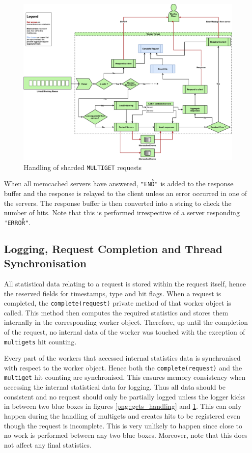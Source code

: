\documentclass[11pt,a4paper]{article}
\begin{document}
\begin{figure}[h]
    \centering
    \includegraphics[width=\textwidth]{processing/graphics/multigets_handling.png}
    \caption{Handling of sharded \texttt{MULTIGET} requests}
    \label{png::multigets_handling}
\end{figure}
When all memcached servers have answered, \texttt{"END\r\n"} is added to the response buffer and the response is relayed to the client unless an error occurred in one of the servers. The response buffer is then converted into a string to check the number of hits. Note that this is performed irrespective of a server responding \texttt{"ERROR\r\n"}.


\subsection{Logging, Request Completion and Thread Synchronisation}
All statistical data relating to a request is stored within the request itself, hence the reserved fields for timestamps, type and hit flags. When a request is completed, the \texttt{complete(request)} private method of that worker object is called. This method then computes the required statistics and stores them internally in the corresponding worker object. Therefore, up until the completion of the request, no internal data of the worker was touched with the exception of \texttt{multigets} hit counting.

Every part of the workers that accessed internal statistics data is synchronised with respect to the worker object. Hence both the \texttt{complete(request)} and the \texttt{multiget} hit counting are synchronised. This ensures memory consistency when accessing the internal statistical data for logging. Thus all data should be consistent and no request should only be partially logged unless the logger kicks in between two blue boxes in figures \ref{png::gets_handling} and \ref{png::multigets_handling}. This can only happen during the handling of multigets and creates hits to be registered even though the request is incomplete. This is very unlikely to happen since close to no work is performed between any two blue boxes. Moreover, note that this does not affect any final statistics.
\end{document}
